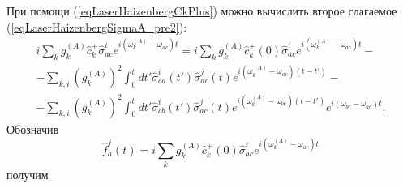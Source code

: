 При помощи (\ref{eqLaserHaizenbergCkPlus}) можно вычислить второе
слагаемое (\ref{eqLaserHaizenbergSigmaA_pre2}):
\begin{eqnarray}
i
\sum_{k}
g_k^{(A)}
\hat{c}_k^{+}\hat{\sigma}^{i}_{ac}  
e^{i\left(\omega_k^{(A)} - \omega_{ac}\right)t} = 
i
\sum_{k}
g_k^{(A)}
\hat{c}_k^{+}\left(0\right)\hat{\sigma}^{i}_{ac}  
e^{i\left(\omega_k^{(A)} - \omega_{ac}\right)t} -
\nonumber \\
-
\sum_{k,i} 
\left(g_{k}^{(A)}\right)^2
\int_0^t d t'
\hat{\sigma}_{ca}^{i}\left(t'\right)\hat{\sigma}^{j}_{ac}\left(t\right) 
e^{i\left(\omega_{k}^{(A)} - \omega_{ac}\right)\left(t-t'\right)}
-
\nonumber \\
-
\sum_{k,i} 
\left(g_{k}^{(A)}\right)^2
\int_0^t d t'
\hat{\sigma}_{cb}^{i}\left(t'\right)\hat{\sigma}^{j}_{ac}\left(t\right) 
e^{i\left(\omega_{k}^{(A)} - \omega_{bc}\right)\left(t-t'\right)}
e^{i\left(\omega_{bc} - \omega_{ac}\right)t}.
\nonumber
\end{eqnarray}
Обозначив
\begin{equation}
\hat{f}_{a}^{j}\left(t\right) = i
\sum_{k}
g_k^{(A)}
\hat{c}_k^{+}\left(0\right)\hat{\sigma}^{i}_{ac}  
e^{i\left(\omega_k^{(A)} - \omega_{ac}\right)t}
\label{eqLaserHaizenbergFAJ}
\end{equation}
получим
